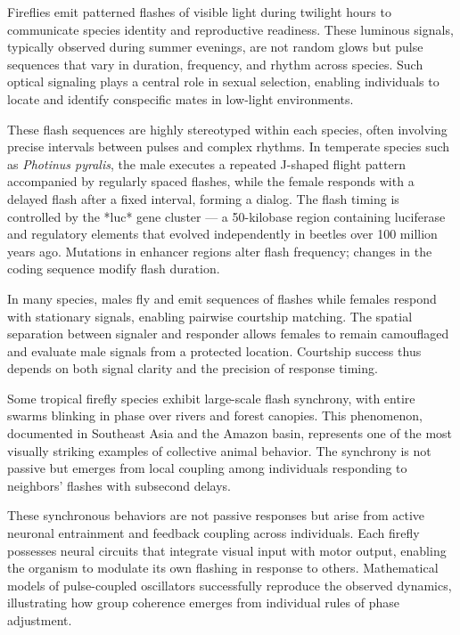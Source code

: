 Fireflies emit patterned flashes of visible light during twilight hours to communicate species identity and reproductive readiness. These luminous signals, typically observed during summer evenings, are not random glows but pulse sequences that vary in duration, frequency, and rhythm across species. Such optical signaling plays a central role in sexual selection, enabling individuals to locate and identify conspecific mates in low-light environments.

These flash sequences are highly stereotyped within each species, often involving precise intervals between pulses and complex rhythms. In temperate species such as \emph{Photinus pyralis}, the male executes a repeated J-shaped flight pattern accompanied by regularly spaced flashes, while the female responds with a delayed flash after a fixed interval, forming a dialog. The flash timing is controlled by the *luc* gene cluster — a 50-kilobase region containing luciferase and regulatory elements that evolved independently in beetles over 100 million years ago. Mutations in enhancer regions alter flash frequency; changes in the coding sequence modify flash duration.

In many species, males fly and emit sequences of flashes while females respond with stationary signals, enabling pairwise courtship matching. The spatial separation between signaler and responder allows females to remain camouflaged and evaluate male signals from a protected location. Courtship success thus depends on both signal clarity and the precision of response timing.

Some tropical firefly species exhibit large-scale flash synchrony, with entire swarms blinking in phase over rivers and forest canopies. This phenomenon, documented in Southeast Asia and the Amazon basin, represents one of the most visually striking examples of collective animal behavior. The synchrony is not passive but emerges from local coupling among individuals responding to neighbors' flashes with subsecond delays.

These synchronous behaviors are not passive responses but arise from active neuronal entrainment and feedback coupling across individuals. Each firefly possesses neural circuits that integrate visual input with motor output, enabling the organism to modulate its own flashing in response to others. Mathematical models of pulse-coupled oscillators successfully reproduce the observed dynamics, illustrating how group coherence emerges from individual rules of phase adjustment.

